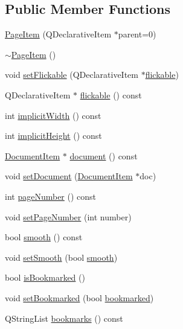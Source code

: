 \subsection*{Public Member Functions}
\begin{DoxyCompactItemize}
\item 
\hyperlink{classPageItem_a53b6c53f883357826b581dcbe08f077b}{Page\+Item} (Q\+Declarative\+Item $\ast$parent=0)
\item 
\hyperlink{classPageItem_afcdefde8bd5a50ac4b5cb51817b750f7}{$\sim$\+Page\+Item} ()
\item 
void \hyperlink{classPageItem_a3f904cf90ff046a1c9063147b471ad08}{set\+Flickable} (Q\+Declarative\+Item $\ast$\hyperlink{classPageItem_af39792e2ec4115ad25422269a02bd1f2}{flickable})
\item 
Q\+Declarative\+Item $\ast$ \hyperlink{classPageItem_a99c4d7521ee476dd67694cbd52b79eba}{flickable} () const 
\item 
int \hyperlink{classPageItem_a525954c0e78b517dfb5c17c87992ddf9}{implicit\+Width} () const 
\item 
int \hyperlink{classPageItem_a13c9faa65832c3e93b3fa5ef1847709f}{implicit\+Height} () const 
\item 
\hyperlink{classDocumentItem}{Document\+Item} $\ast$ \hyperlink{classPageItem_a10192a4073b812d2ad5628a8779d2d00}{document} () const 
\item 
void \hyperlink{classPageItem_a5b0607e27baa0e25772d2d3611fb35dd}{set\+Document} (\hyperlink{classDocumentItem}{Document\+Item} $\ast$doc)
\item 
int \hyperlink{classPageItem_a290317eadb966368d13e9c8cddf27f9e}{page\+Number} () const 
\item 
void \hyperlink{classPageItem_aaed366fb2cb34b80f68980a05db4d3df}{set\+Page\+Number} (int number)
\item 
bool \hyperlink{classPageItem_ab6bf0fffe91fe6a682d94e04aedd5c6a}{smooth} () const 
\item 
void \hyperlink{classPageItem_ac62761688e280da27a5a034a7681ce92}{set\+Smooth} (bool \hyperlink{classPageItem_a790f5adc2ae400da2f113d06e5fbb960}{smooth})
\item 
bool \hyperlink{classPageItem_a8f5c7e4f9a9d0bc2bdc961c6ebfd223e}{is\+Bookmarked} ()
\item 
void \hyperlink{classPageItem_a7eb4daf2e12bef7a7abe7a77332efc89}{set\+Bookmarked} (bool \hyperlink{classPageItem_afda223875d28abb3e8dcd8ed02531cec}{bookmarked})
\item 
Q\+String\+List \hyperlink{classPageItem_a228f6e6bf7db94304bde9896a5044d50}{bookmarks} () const 

\end{DoxyCompactItemize}
